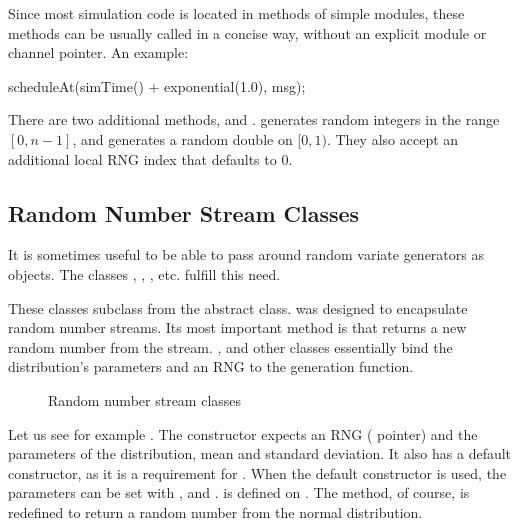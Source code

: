 Since most simulation code is located in methods of simple modules, these
methods can be usually called in a concise way, without an explicit module
or channel pointer. An example:

\begin{cpp}
scheduleAt(simTime() + exponential(1.0), msg);
\end{cpp}

There are two additional methods,  and .
 generates random integers in the range $[0, n-1]$, and
 generates a random double on $[0,1)$. They also accept
an additional local RNG index that defaults to 0.

\subsection{Random Number Stream Classes}
\label{sec:sim-lib:random-number-stream-classes}

It is sometimes useful to be able to pass around random variate generators
as objects. The classes , ,
, etc. fulfill this need.

These classes subclass from the  abstract class.
 was designed to encapsulate random number streams. Its
most important method is  that returns a new random number
from the stream. ,  and other classes
essentially bind the distribution's parameters and an RNG to the generation
function.

\begin{figure}[htbp]
  \begin{center}
    
    \caption{Random number stream classes}
  \end{center}
\end{figure}

Let us see for example . The constructor expects an RNG
( pointer) and the parameters of the distribution, mean and
standard deviation. It also has a default constructor, as it is a
requirement for . When the default constructor
is used, the parameters can be set with , 
and .  is defined on .
The  method, of course, is redefined to return a random
number from the normal distribution.

